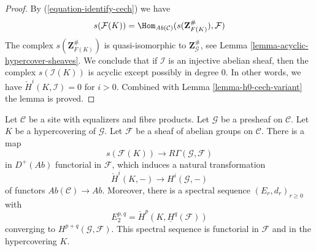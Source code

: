 \begin{proof}
By (\ref{equation-identify-cech}) we have
$$
s(\mathcal{F}(K))
=
\Hom_{\textit{Ab}(\mathcal{C})}(s(\mathbf{Z}_{F(K)}^\#), \mathcal{F})
$$
The complex $s(\mathbf{Z}_{F(K)}^\#)$ is quasi-isomorphic
to $\mathbf{Z}_\mathcal{G}^\#$, see
Lemma \ref{lemma-acyclic-hypercover-sheaves}. We conclude
that if $\mathcal{I}$ is an injective abelian sheaf, then
the complex $s(\mathcal{I}(K))$ is acyclic except possibly in degree $0$.
In other words, we have $\check{H}^i(K, \mathcal{I}) = 0$
for $i > 0$. Combined with Lemma \ref{lemma-h0-cech-variant}
the lemma is proved.
\end{proof}

\begin{lemma}
\label{lemma-cech-spectral-sequence-variant}
Let $\mathcal{C}$ be a site with equalizers and fibre products.
Let $\mathcal{G}$ be a presheaf on $\mathcal{C}$.
Let $K$ be a hypercovering of $\mathcal{G}$.
Let $\mathcal{F}$ be a sheaf of abelian groups on $\mathcal{C}$.
There is a map
$$
s(\mathcal{F}(K)) \longrightarrow R\Gamma(\mathcal{G}, \mathcal{F})
$$
in $D^{+}(\textit{Ab})$ functorial in $\mathcal{F}$, which induces
a natural transformation
$$
\check{H}^i(K, -) \longrightarrow H^i(\mathcal{G}, -)
$$
of functors $\textit{Ab}(\mathcal{C}) \to \textit{Ab}$. Moreover,
there is a spectral sequence $(E_r, d_r)_{r \geq 0}$ with
$$
E_2^{p, q} = \check{H}^p(K, \underline{H}^q(\mathcal{F}))
$$
converging to $H^{p + q}(\mathcal{G}, \mathcal{F})$.
This spectral sequence is functorial in $\mathcal{F}$ and
in the hypercovering $K$.
\end{lemma}


